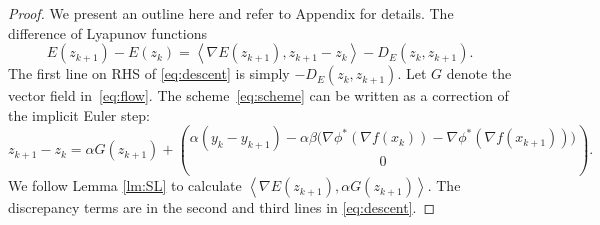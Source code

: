 \documentclass{article}
\newcommand{\dual}[1]{\left\langle {#1} \right\rangle}
\theoremstyle{plain}
\theoremstyle{definition}
\theoremstyle{remark}
\begin{document}
\begin{proof}
We present an outline here and refer to Appendix for details. The difference of Lyapunov functions 
$$
E(z_{k+1})-E(z_k) = \dual{\nabla E(z_{k+1}),z_{k+1}-z_k} -D_E(z_k,z_{k+1}).
$$
The first line on RHS of \eqref{eq:descent} is simply $-D_E(z_k,z_{k+1})$. 
Let $G$ denote the vector field in~\eqref{eq:flow}. The scheme~\eqref{eq:scheme} can be written as a correction of the implicit Euler step:
$$z_{k+1}-z_k=\alpha G(z_{k+1})+\binom{\alpha(y_k-y_{k+1})-\alpha\beta\bigl(\nabla\phi^*(\nabla f(x_k))-\nabla\phi^*(\nabla f(x_{k+1}))\bigr)}{0}.$$
We follow Lemma \ref{lm:SL} to calculate $\dual{\nabla E(z_{k+1}), \alpha G(z_{k+1})}$. The discrepancy terms are in the second and third lines in \eqref{eq:descent}. 
%
%
\end{proof}
\end{document}
